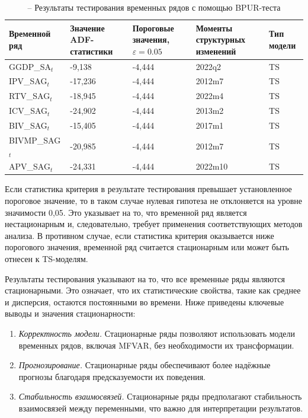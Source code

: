 \documentclass[a4paper, 14pt]{extreport}
\numberwithin{equation}{subsection}
\numberwithin{equation}{section}
\begin{document}
	
	\begin{table}[h]
		\centering
		\caption{\label{bpur} -- Результаты тестирования временных рядов с помощью BPUR-теста}
		\label{table:BPUR-test}
		\begin{tabular}{|p{3cm}|p{3cm}|p{2.5cm}|p{3cm}|p{2cm}|}
			\hline
			{Временной ряд} & 
			{Значение ADF-статистики} & 
			{Пороговые значения, $\varepsilon = 0.05$} & 
			{Моменты структурных изменений} & 
			{Тип модели} \\ \hline
			GGDP\_SA$_t$ & -9,138  & -4,444 & 2022q2  & TS \\ \hline
			IPV\_SAG$_t$ & -17,236 & -4,444 & 2012m7  & TS \\ \hline
			RTV\_SAG$_t$ & -18,945 & -4,444 & 2022m4  & TS \\ \hline
			ICV\_SAG$_t$ & -24,902 & -4,444 & 2013m2  & TS \\ \hline
			BIV\_SAG$_t$ & -15,405 & -4,444 & 2017m1  & TS \\ \hline
			BIVMP\_SAG$_t$ & -20,985 & -4,444 & 2012m7 & TS \\ \hline
			APV\_SAG$_t$ & -24,331 & -4,444 & 2022m10 & TS \\ \hline
		\end{tabular}
	\end{table}
		
	Если статистика критерия в результате тестирования превышает установленное пороговое значение, то в таком случае нулевая гипотеза не отклоняется на уровне значимости 0,05. Это указывает на то, что временной ряд является нестационарным и, следовательно, требует применения соответствующих методов анализа. В противном случае, если статистика критерия оказывается ниже порогового значения, временной ряд считается стационарным или может быть отнесен к TS-моделям.
	
	Результаты тестирования указывают на то, что все временные ряды являются стационарными. Это означает, что их статистические свойства, такие как среднее и дисперсия, остаются постоянными во времени. Ниже приведены ключевые выводы и значения стационарности:
	\begin{enumerate}
		\item \textit{Корректность модели.} Стационарные ряды позволяют использовать модели временных рядов, включая MFVAR, без необходимости их трансформации.
		\item \textit{Прогнозирование.} Стационарные ряды обеспечивают более надёжные прогнозы благодаря предсказуемости их поведения.
		\item \textit{Стабильность взаимосвязей.} Стационарные ряды предполагают стабильность взаимосвязей между переменными, что важно для интерпретации результатов.
	\end{enumerate}
	
\end{document}
